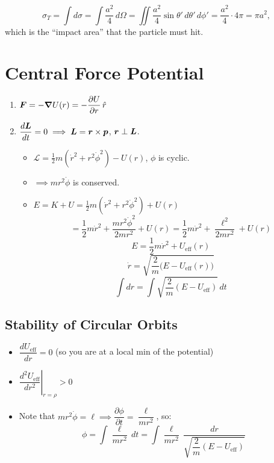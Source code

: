 \[
    \sigma_T = \int d\sigma = \int\frac{a^2}{4}\,d\Omega
    = \iint\frac{a^2}{4}\sin\theta'\,d\theta'\,d\phi'
    = \frac{a^2}{4}\cdot 4\pi = \pi a^2,
\]
which is the ``impact area'' that the particle must hit.

\section{Central Force Potential}

\begin{enumerate}
    \item $\vect{F} = -\grad U(r) = -\dfrac{\partial U}{\partial r}\,\hat{r}$
    \item $\dfrac{d\vect{L}}{dt} = 0 \implies \vect{L} = \lvect{r}\times\lvect{p}$, $\lvect{r}\perp\vect{L}$.
    \begin{itemize}
        \item $\mathcal{L} = \frac{1}{2}m(\dot{r}^2 + r^2\dot{\phi}^2) - U(r)$, $\phi$ is cyclic.
        \item $\implies mr^2\dot{\phi}$ is conserved.
        \item $E = K + U = \frac{1}{2}m(\dot{r}^2 + r^2\dot{\phi}^2) + U(r)$
        \[
            = \frac{1}{2}m\dot{r}^2 + \frac{mr^2\dot{\phi}^2}{2mr^2} + U(r)
            = \frac{1}{2}m\dot{r}^2 + \frac{\ell^2}{2mr^2} + U(r)
        \]
        \[
            E = \frac{1}{2}m\dot{r}^2 + U_{\text{eff}}(r)
        \]
        \[
            \dot{r} = \sqrt{\frac{2}{m}\bigl(E - U_{\text{eff}}(r)\bigr)}
        \]
        \[
            \int dr = \int\sqrt{\frac{2}{m}(E-U_{\text{eff}})}\,dt
        \]
    \end{itemize}
\end{enumerate}

\subsection{Stability of Circular Orbits}

\begin{itemize}
    \item $\dfrac{dU_{\text{eff}}}{dr} = 0$ (so you are at a local min of the potential)
    \item $\left.\dfrac{d^2 U_{\text{eff}}}{dr^2}\right|_{r=\rho} > 0$
    \item Note that $mr^2\dot{\phi} = \ell \implies \dfrac{\partial\phi}{\partial t} = \dfrac{\ell}{mr^2}$, so:
    \[
        \phi = \int\frac{\ell}{mr^2}\,dt = \int\frac{\ell}{mr^2}\,\frac{dr}{\sqrt{\dfrac{2}{m}(E-U_{\text{eff}})}}
    \]
\end{itemize}

